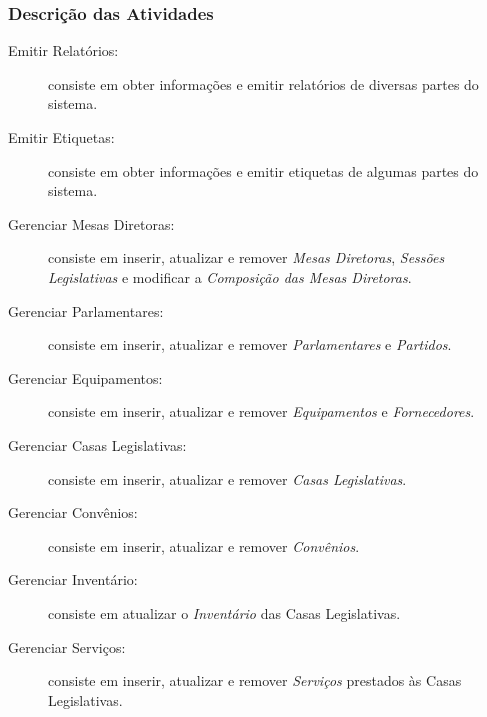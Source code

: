 \subsubsection{Descrição das Atividades}
\begin{description}
\item[Emitir Relatórios:] consiste em obter informações e emitir
  relatórios de diversas partes do sistema.
\item[Emitir Etiquetas:] consiste em obter informações e emitir
  etiquetas de algumas partes do sistema.
\item[Gerenciar Mesas Diretoras:] consiste em inserir, atualizar e
  remover \emph{Mesas Diretoras}, \emph{Sessões Legislativas} e
  modificar a \emph{Composição das Mesas Diretoras}.
\item[Gerenciar Parlamentares:] consiste em inserir, atualizar e
  remover \emph{Parlamentares} e \emph{Partidos}.
\item[Gerenciar Equipamentos:] consiste em inserir, atualizar e
  remover \emph{Equipamentos} e \emph{Fornecedores}.
\item[Gerenciar Casas Legislativas:] consiste em inserir, atualizar e
  remover \emph{Casas Legislativas}.
\item[Gerenciar Convênios:] consiste em inserir, atualizar e remover
  \emph{Convênios}.
\item[Gerenciar Inventário:] consiste em atualizar o \emph{Inventário}
  das Casas Legislativas.
\item[Gerenciar Serviços:] consiste em inserir, atualizar e remover
  \emph{Serviços} prestados às Casas Legislativas.
\end{description}

%
%
